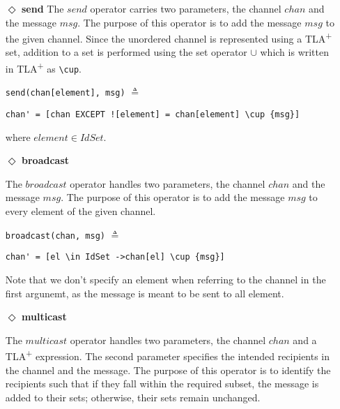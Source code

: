 \documentclass{thesul}
\newcommand{\tlaplus}{TLA\textsuperscript{+}\xspace}
\begin{document}
\begin{itemize}
\item[$\Diamond$]  \textbf{send} The $send$ operator carries two parameters, the channel $chan$ and the message $msg$. The purpose of this operator is to add the message $msg$ to
the given channel. Since the unordered channel is represented using a \tlaplus set, addition to a set is performed using the set operator $\cup$ which is written in \tlaplus as \lstinline|\cup|.


\begin{minipage}{.3\textwidth}

\lstinline|send(chan[element], msg)| $\triangleq$\\
\end{minipage}\hfill
\begin{minipage}{.7\textwidth}
\begin{lstlisting}[frame = none, numbers = none]
chan' = [chan EXCEPT ![element] = chan[element] \cup {msg}]
\end{lstlisting}

\end{minipage}\hfill
where $element \in IdSet$.
\item[$\Diamond$]  \textbf{broadcast}

The $broadcast$ operator handles two parameters, the channel $chan$ and the message $msg$. The purpose of this operator is to add the message $msg$ to every element of the given channel.

\begin{minipage}{.25\textwidth}

\lstinline|broadcast(chan, msg)| $\triangleq$
\end{minipage}\hfill
\begin{minipage}{.7\textwidth}
\begin{lstlisting}[frame = none, numbers = none]
chan' = [el \in IdSet ->chan[el] \cup {msg}]
\end{lstlisting}

\end{minipage}\hfill

Note that we don't specify an element when referring to the channel in the first argunemt, as the message is meant to be sent to all element.
\item[$\Diamond$] \textbf{multicast}

The $multicast$ operator handles two parameters, the channel $chan$ and a \tlaplus expression. The second parameter specifies the intended recipients in the channel and the message. The purpose of this operator is to identify the recipients such that if they fall within the required subset, the message is added to their sets; otherwise, their sets remain unchanged.


\end{itemize}
\end{document}
